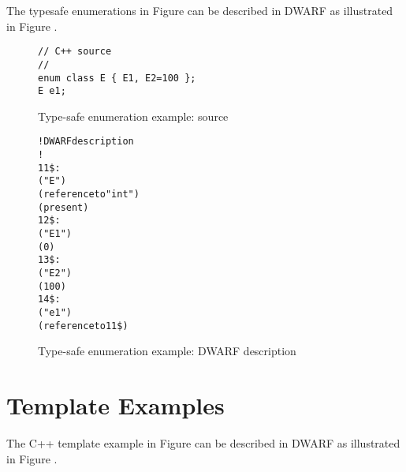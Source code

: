 The  type\dash safe enumerations in
Figure 
can be described in DWARF as illustrated in 
Figure .

\clearpage	%

\begin{figure}[H]
\begin{lstlisting}[numbers=none]
// C++ source
//
enum class E { E1, E2=100 };
E e1;
\end{lstlisting}
\caption{Type-safe enumeration example: source}
\label{fig:ctypesafeenumerationexamplesource}
\end{figure}

\begin{figure}[H]
\begin{dwflisting}
\begin{alltt}
! DWARF description
!
11\$:  
          ("E")
          (reference to "int")
          (present)
12\$:      
              ("E1")
              (0)
13\$:      
              ("E2")
              (100)
14\$:  
         ("e1")
         (reference to 11\$)
\end{alltt}
\end{dwflisting}
\caption{Type-safe enumeration example: DWARF description}
\label{fig:ctypesafeenumerationexampledwarf}
\end{figure}


\clearpage
\section{Template Examples}
\label{app:templateexample}

The C++ template example in
Figure 
can be described in DWARF as illustrated in 
Figure .

